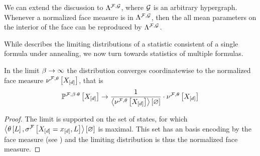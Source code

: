 We can extend the discussion to $\Lambda^{\mathcal{F},\mathcal{G}}$, where $\mathcal{G}$ is an arbitrary hypergraph.
Whenever a normalized face measure is in $\Lambda^{\mathcal{F},\mathcal{G}}$, then the all mean parameters on the interior of the face can be reproduced by $\Lambda^{\mathcal{F},\mathcal{G}}$.

%

\label{sec:hardLogicLimit}

While  describes the limiting distributions of a statistic consistent of a single formula under annealing, we now turn towards statistics of multiple formulas.

\begin{theorem}
    \label{the:limitingDistribution}
    In the limit $\beta\rightarrow\infty$ the distribution converges coordinatewise to the normalized face measure $\nu^{\mathcal{F},\theta}\left[X_{[d]}\right]$, that is
    \begin{align*}
        \mathbb{P}^{\mathcal{F},\beta\cdot\theta}\left[X_{[d]}\right] \rightarrow \frac{1}{\left\langle \nu^{\mathcal{F},\theta}\left[X_{[d]}\right]\right\rangle \left[ \varnothing \right]} \cdot \nu^{\mathcal{F},\theta}\left[X_{[d]}\right]
    \end{align*}
\end{theorem}
\begin{proof}
    The limit is supported on the set of states, for which $\left\langle \theta\left[L\right],\sigma^{\mathcal{F}}\left[X_{[d]}=x_{[d]},L\right]\right\rangle \left[ \varnothing \right]$ is maximal.
    This set has an basis encoding by the face measure (see ) and the limiting distribution is thus the normalized face measure.
\end{proof}

